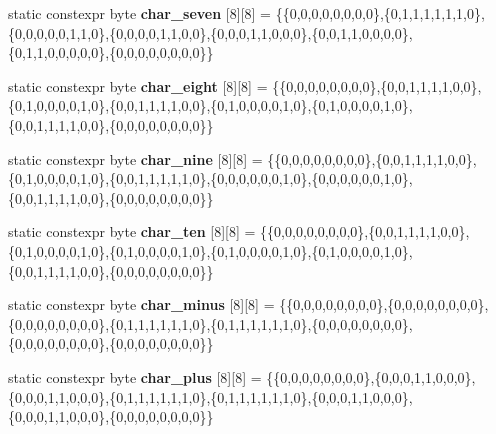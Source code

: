 \begin{DoxyCompactItemize}
\item 
static constexpr byte {\bfseries char\+\_\+seven} \mbox{[}8\mbox{]}\mbox{[}8\mbox{]} = \{\{0,0,0,0,0,0,0,0\},\{0,1,1,1,1,1,1,0\},\{0,0,0,0,0,1,1,0\},\{0,0,0,0,1,1,0,0\},\{0,0,0,1,1,0,0,0\},\{0,0,1,1,0,0,0,0\},\{0,1,1,0,0,0,0,0\},\{0,0,0,0,0,0,0,0\}\}\hypertarget{classcharacters_a366632070dc78663e0e3976c5b182082}{}\label{classcharacters_a366632070dc78663e0e3976c5b182082}

\item 
static constexpr byte {\bfseries char\+\_\+eight} \mbox{[}8\mbox{]}\mbox{[}8\mbox{]} = \{\{0,0,0,0,0,0,0,0\},\{0,0,1,1,1,1,0,0\},\{0,1,0,0,0,0,1,0\},\{0,0,1,1,1,1,0,0\},\{0,1,0,0,0,0,1,0\},\{0,1,0,0,0,0,1,0\},\{0,0,1,1,1,1,0,0\},\{0,0,0,0,0,0,0,0\}\}\hypertarget{classcharacters_a7d4d2c9e0007166f2ca1910d56614104}{}\label{classcharacters_a7d4d2c9e0007166f2ca1910d56614104}

\item 
static constexpr byte {\bfseries char\+\_\+nine} \mbox{[}8\mbox{]}\mbox{[}8\mbox{]} = \{\{0,0,0,0,0,0,0,0\},\{0,0,1,1,1,1,0,0\},\{0,1,0,0,0,0,1,0\},\{0,0,1,1,1,1,1,0\},\{0,0,0,0,0,0,1,0\},\{0,0,0,0,0,0,1,0\},\{0,0,1,1,1,1,0,0\},\{0,0,0,0,0,0,0,0\}\}\hypertarget{classcharacters_a881290ccc939283c2e3255568285b666}{}\label{classcharacters_a881290ccc939283c2e3255568285b666}

\item 
static constexpr byte {\bfseries char\+\_\+ten} \mbox{[}8\mbox{]}\mbox{[}8\mbox{]} = \{\{0,0,0,0,0,0,0,0\},\{0,0,1,1,1,1,0,0\},\{0,1,0,0,0,0,1,0\},\{0,1,0,0,0,0,1,0\},\{0,1,0,0,0,0,1,0\},\{0,1,0,0,0,0,1,0\},\{0,0,1,1,1,1,0,0\},\{0,0,0,0,0,0,0,0\}\}\hypertarget{classcharacters_aaab971e0c32f7b13854b26655ec1cbfe}{}\label{classcharacters_aaab971e0c32f7b13854b26655ec1cbfe}

\item 
static constexpr byte {\bfseries char\+\_\+minus} \mbox{[}8\mbox{]}\mbox{[}8\mbox{]} = \{\{0,0,0,0,0,0,0,0\},\{0,0,0,0,0,0,0,0\},\{0,0,0,0,0,0,0,0\},\{0,1,1,1,1,1,1,0\},\{0,1,1,1,1,1,1,0\},\{0,0,0,0,0,0,0,0\},\{0,0,0,0,0,0,0,0\},\{0,0,0,0,0,0,0,0\}\}\hypertarget{classcharacters_aa3bd737d6fca5384b212fa3c1eeb82fc}{}\label{classcharacters_aa3bd737d6fca5384b212fa3c1eeb82fc}

\item 
static constexpr byte {\bfseries char\+\_\+plus} \mbox{[}8\mbox{]}\mbox{[}8\mbox{]} = \{\{0,0,0,0,0,0,0,0\},\{0,0,0,1,1,0,0,0\},\{0,0,0,1,1,0,0,0\},\{0,1,1,1,1,1,1,0\},\{0,1,1,1,1,1,1,0\},\{0,0,0,1,1,0,0,0\},\{0,0,0,1,1,0,0,0\},\{0,0,0,0,0,0,0,0\}\}\hypertarget{classcharacters_a71572fdcf4992ea829a82433f2dcc32e}{}\label{classcharacters_a71572fdcf4992ea829a82433f2dcc32e}


\end{DoxyCompactItemize}
